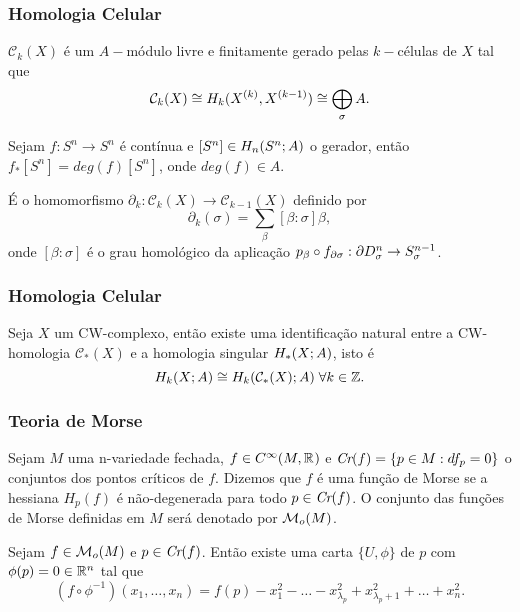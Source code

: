 \documentclass{beamer}
\begin{document}
\begin{footnotesize}
	\begin{frame}
		
		\frametitle{Homologia Celular}
		\begin{lema}
			$\mathcal{C}_{k}(X)$ é um $A-$módulo livre e finitamente gerado pelas $k-$células de $X$ tal que 
			$$
			\mathcal{C}_{k}(X) \cong 
			H_{k}(X^{(k)}, X^{(k-1)}) \cong \bigoplus \limits_{\sigma} A.
			$$
		\end{lema}
		
		\begin{definicao}
			Sejam $f: S^{n} \to S^{n}$ é contínua e $[S^{n}] \in H_{n}(S^{n};A)$ o gerador, então $f_{*}[S^{n}] = deg(f)[S^{n}]$, onde $deg(f) \in A$.
		\end{definicao}
		
		\begin{teorema}[CW-bordo]
			É o homomorfismo $\partial_{k}:\mathcal{C}_{k}(X)\to \mathcal{C}_{k-1}(X)$ definido por
			$$
			\partial_{k}(\sigma) = \sum_{\beta}[\beta:\sigma]\beta,
			$$
			onde $[\beta:\sigma]$ é o grau homológico da aplicação $p_{\beta} \circ f_{\partial\sigma}:\partial D^{n}_{\sigma} \to S^{n-1}_{\sigma}$.
		\end{teorema}
		
	\end{frame}

	\begin{frame}
		\frametitle{Homologia Celular}
		\begin{teorema}[CW-homologia]
			Seja $X$ um CW-complexo, então existe uma identificação natural entre a CW-homologia $\mathcal{C}_{*}(X)$ e a homologia singular $H_{*}(X;A)$, isto é 
			$$
			H_{k}(X;A) \cong H_{k}(\mathcal{C}_{*}(X);A)\; \forall k \in \mathbb{Z}.
			$$
		\end{teorema}
		
	\end{frame}

	\begin{frame}
		\frametitle{Teoria de Morse}
		\begin{definicao}
			Sejam $M$ uma n-variedade fechada, $f \in C^{\infty}(M, \mathbb{R}^{})$ e $\textit{Cr}(f) = \{p \in M: df_{p} = 0\}$ o conjuntos dos pontos críticos de $f$. Dizemos que $f$ é uma função de Morse se a hessiana $H_{p}(f)$ é não-degenerada para todo $p \in \textit{Cr}(f)$. O conjunto das funções de Morse definidas em $M$ será denotado por $\mathcal{M}_{o}(M)$. 
		\end{definicao}
		\begin{lema}
			Sejam $f \in \mathcal{M}_{o}(M)$ e $p \in \textit{Cr}(f)$. Então existe uma carta $\{U, \phi\}$ de $p$ com $\phi(p)=0 \in \mathbb{R}^{n}$ tal que 
			$$
			(f\circ \phi^{-1})(x_{1}, \dots, x_{n}) = f(p)-x_{1}^{2}-\dots -x^{2}_{\lambda_{p}}+x^{2}_{\lambda_{p}+1}+\dots + x^{2}_{n}.
			$$
		\end{lema}
	\end{frame}
	

\end{footnotesize}
\end{document}
